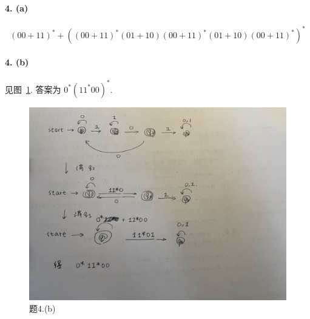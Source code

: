 \documentclass[12pt]{ctexart}
\theoremstyle{definition}
\theoremstyle{definition}
\theoremstyle{plain}
\theoremstyle{remark}
\begin{document}
\paragraph{4. (a)}
% 
% 


\[
	( 00 + 11 ) ^{ *} + ((00 + 11 )^{*} ( 01 + 10 )( 00 + 11 ) ^{*} (01 + 10 ) ( 00 + 11) ^{*}  )^{*}
\]



\paragraph{4. (b)}
见图~\ref{fig:42}. 答案为
\(
	0^{*}(1 1 ^{*} 00 ) ^{*}
\).
\begin{figure}[h]
	\centering
	\includegraphics[width=\linewidth]{hw01_42.jpg}
	\caption{题4.(b)}\label{fig:42}
\end{figure}


\end{document}

